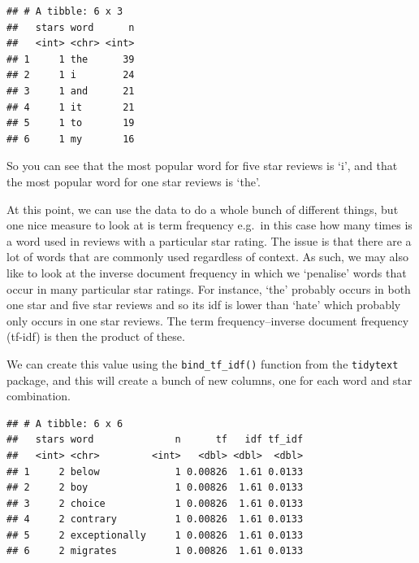 \documentclass[
]{book}
\newenvironment{Shaded}{\begin{snugshade}}{\end{snugshade}}
\newcommand{\CommentTok}[1]{\textcolor[rgb]{0.56,0.35,0.01}{\textit{#1}}}
\newcommand{\KeywordTok}[1]{\textcolor[rgb]{0.13,0.29,0.53}{\textbf{#1}}}
\newcommand{\NormalTok}[1]{#1}
\newcommand{\OperatorTok}[1]{\textcolor[rgb]{0.81,0.36,0.00}{\textbf{#1}}}
\newcommand{\StringTok}[1]{\textcolor[rgb]{0.31,0.60,0.02}{#1}}
\begin{document}
\begin{verbatim}
## # A tibble: 6 x 3
##   stars word      n
##   <int> <chr> <int>
## 1     1 the      39
## 2     1 i        24
## 3     1 and      21
## 4     1 it       21
## 5     1 to       19
## 6     1 my       16
\end{verbatim}

So you can see that the most popular word for five star reviews is `i', and that the most popular word for one star reviews is `the'.

At this point, we can use the data to do a whole bunch of different things, but one nice measure to look at is term frequency e.g.~in this case how many times is a word used in reviews with a particular star rating. The issue is that there are a lot of words that are commonly used regardless of context. As such, we may also like to look at the inverse document frequency in which we `penalise' words that occur in many particular star ratings. For instance, `the' probably occurs in both one star and five star reviews and so its idf is lower than `hate' which probably only occurs in one star reviews. The term frequency--inverse document frequency (tf-idf) is then the product of these.

We can create this value using the \texttt{bind\_tf\_idf()} function from the \texttt{tidytext} package, and this will create a bunch of new columns, one for each word and star combination.

\begin{Shaded}
\end{Shaded}

\begin{verbatim}
## # A tibble: 6 x 6
##   stars word              n      tf   idf tf_idf
##   <int> <chr>         <int>   <dbl> <dbl>  <dbl>
## 1     2 below             1 0.00826  1.61 0.0133
## 2     2 boy               1 0.00826  1.61 0.0133
## 3     2 choice            1 0.00826  1.61 0.0133
## 4     2 contrary          1 0.00826  1.61 0.0133
## 5     2 exceptionally     1 0.00826  1.61 0.0133
## 6     2 migrates          1 0.00826  1.61 0.0133
\end{verbatim}
\end{document}
